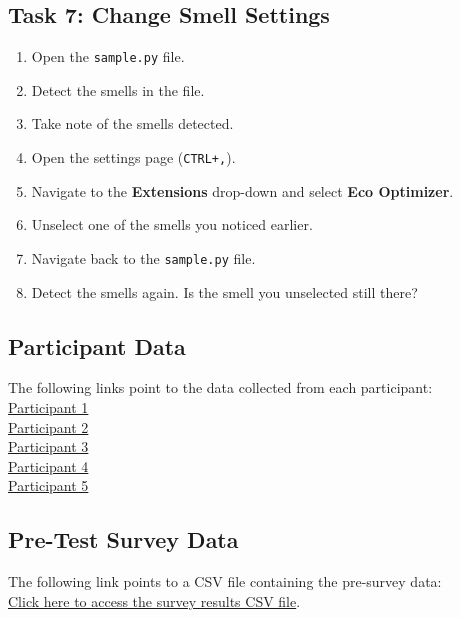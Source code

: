 \documentclass[12pt, titlepage]{article}
\begin{document}
\subsection*{Task 7: Change Smell Settings}
\begin{enumerate}
  \item Open the \texttt{sample.py} file.
  \item Detect the smells in the file.
  \item Take note of the smells detected.
  \item Open the settings page (\texttt{CTRL+,}).
  \item Navigate to the \textbf{Extensions} drop-down and select
    \textbf{Eco Optimizer}.
  \item Unselect one of the smells you noticed earlier.
  \item Navigate back to the \texttt{sample.py} file.
  \item Detect the smells again. Is the smell you unselected still there?
\end{enumerate}

\subsection*{Participant Data}
The following links point to the data collected from each participant:\\

{\noindent
  \href{run:./../Extras/UsabilityTesting/test_data/participant1-data.csv}{Participant
  1} \\[2mm]
  \href{run:./../Extras/UsabilityTesting/test_data/participant2-data.csv}{Participant
  2} \\[2mm]
  \href{run:./../Extras/UsabilityTesting/test_data/participant3-data.csv}{Participant
  3} \\[2mm]
  \href{run:./../Extras/UsabilityTesting/test_data/participant4-data.csv}{Participant
  4} \\[2mm]
  \href{run:./../Extras/UsabilityTesting/test_data/participant5-data.csv}{Participant
  5}
}

\subsection*{Pre-Test Survey Data}
The following link points to a CSV file containing the pre-survey data:\\

\noindent
\href{run:./../Extras/UsabilityTesting/surveys/pre-test-survey-data.csv}{Click
here to access the survey results CSV file}.
\end{document}
